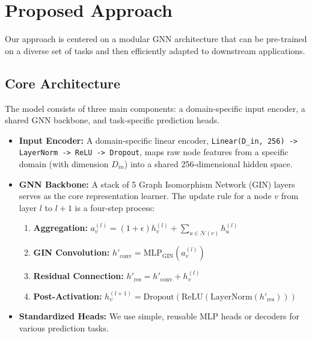 \documentclass{acmart}
\begin{document}
\section{Proposed Approach}

Our approach is centered on a modular GNN architecture that can be pre-trained on a diverse set of tasks and then efficiently adapted to downstream applications.

\subsection{Core Architecture}
The model consists of three main components: a domain-specific input encoder, a shared GNN backbone, and task-specific prediction heads.
\begin{itemize}
    \item \textbf{Input Encoder:} A domain-specific linear encoder, \texttt{Linear(D\_in, 256) -> LayerNorm -> ReLU -> Dropout}, maps raw node features from a specific domain (with dimension $D_{in}$) into a shared 256-dimensional hidden space.
    \item \textbf{GNN Backbone:} A stack of 5 Graph Isomorphism Network (GIN) layers serves as the core representation learner. The update rule for a node $v$ from layer $l$ to $l+1$ is a four-step process:
        \begin{enumerate}
            \item \textbf{Aggregation:} $a_v^{(l)} = (1+\epsilon) h_v^{(l)} + \sum_{u \in \mathcal{N}(v)} h_u^{(l)}$
            \item \textbf{GIN Convolution:} $h'_{\text{conv}} = \text{MLP}_{\text{GIN}} ( a_v^{(l)} )$
            \item \textbf{Residual Connection:} $h'_{\text{res}} = h'_{\text{conv}} + h_v^{(l)}$
            \item \textbf{Post-Activation:} $h_v^{(l+1)} = \text{Dropout} ( \text{ReLU} ( \text{LayerNorm} ( h'_{\text{res}} ) ) )$
        \end{enumerate}
    \item \textbf{Standardized Heads:} We use simple, reusable MLP heads or decoders for various prediction tasks.
\end{itemize}
\end{document}
